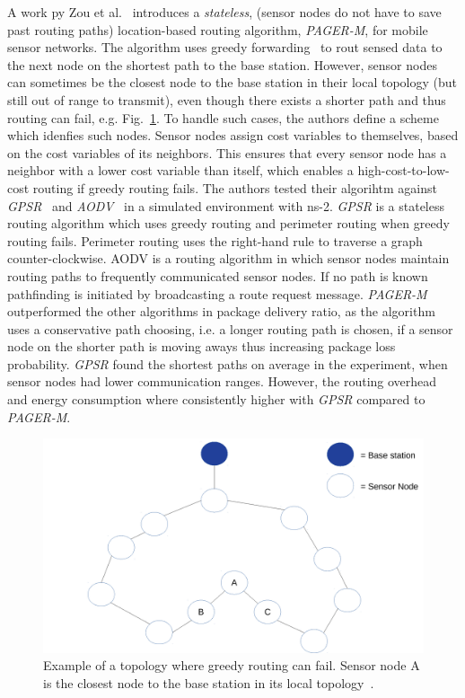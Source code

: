 A work py Zou et al.~\cite{zou2004pager} introduces a \textit{stateless},
(sensor nodes do not have to save past routing paths) location-based routing
algorithm, \textit{PAGER-M}, for mobile sensor networks. The algorithm uses
greedy forwarding~\cite{stojmenovic2001loop} to rout sensed data to the next
node on the shortest path to the base station. However, sensor nodes can
sometimes be the closest node to the base station in their local topology (but
still out of range to transmit), even though there exists a shorter path and
thus routing can fail, e.g. Fig.~\ref{fig:shadow nodes}. To handle such cases,
the authors define a scheme which idenfies such nodes. Sensor nodes assign cost
variables to themselves, based on the cost variables of its neighbors. This
ensures that every sensor node has a neighbor with a lower cost variable than
itself, which enables a high-cost-to-low-cost routing if greedy routing fails.
The authors tested their algorihtm against \textit{GPSR}~\cite{karp2000gpsr}
and \textit{AODV}~\cite{perkins2003ad} in a simulated environment with ns-2.
\textit{GPSR} is a stateless routing algorithm which uses greedy routing and
perimeter routing when greedy routing fails. Perimeter routing uses the
right-hand rule to traverse a graph counter-clockwise. AODV is a routing
algorithm in which sensor nodes maintain routing paths to frequently
communicated sensor nodes. If no path is known pathfinding is initiated by
broadcasting a route request message. \textit{PAGER-M} outperformed the other
algorithms in package delivery ratio, as the algorithm uses a conservative path
choosing, i.e. a longer routing path is chosen, if a sensor node on the shorter
path is moving aways thus increasing package loss probability. \textit{GPSR}
found the shortest paths on average in the experiment, when sensor nodes had
lower communication ranges. However, the routing overhead and energy
consumption where consistently higher with \textit{GPSR} compared to
\textit{PAGER-M}.

\begin{figure}[h]
\includegraphics[width=\linewidth]{images/pager-shadow-nodes.pdf}
\caption{Example of a topology where greedy routing can fail. Sensor node A is
the closest node to the base station in its local topology~\cite{zou2004pager}.}
\label{fig:shadow nodes}
\centering
\end{figure}

